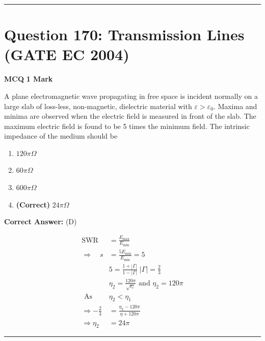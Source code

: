 \documentclass[11pt,a4paper]{article}
\begin{document}
\vspace{1.5em}
\hrule
\vspace{1.5em}

\section*{Question 170: Transmission Lines (GATE EC 2004)}
\noindent \textbf{\color{primary}MCQ} \hfill \textbf{\color{secondary}1 Mark}


\noindent A plane electromagnetic wave propagating in free space is incident normally on a large slab of loss-less, non-magnetic, dielectric material with $\varepsilon >\varepsilon _{0}$. Maxima and minima are observed when the electric field is measured in front of the slab. The maximum electric field is found to be 5 times the minimum field. The intrinsic impedance of the medium should be


\begin{enumerate}[label=(\Alph*)]
    \item $120 \pi \Omega$
    \item $60 \pi \Omega$
    \item $600 \pi \Omega$
    \item \textbf{(Correct)} $24 \pi \Omega$
\end{enumerate}

\noindent \textbf{Correct Answer:} (D)

\begin{tcolorbox}[solbox, title=Detailed Solution -- Question 170]
\[
\begin{aligned} \text{SWR} &=\frac{E_{\max }}{E_{\min }} \\ \Rightarrow \quad s &=\frac{5 E_{\min }}{E_{\min }}=5 \\ & 5=\frac{1+|\Gamma|}{1-|\Gamma|}\;|\Gamma|=\frac{2}{3} \\ & \eta_{2}=\frac{120 \pi}{\sqrt{\epsilon_{r}}} \text { and } \eta_{2}=120 \pi \\ \text { As } & \eta_{2} < \eta_{1} \\ \Rightarrow -\frac{2}{3}&=\frac{\eta_{2}-120 \pi}{\eta+120 \pi} \\ \Rightarrow \eta_{2}&=24 \pi \end{aligned}
\]
\end{tcolorbox}

\vspace{1.5em}
\hrule
\vspace{1.5em}
\end{document}

